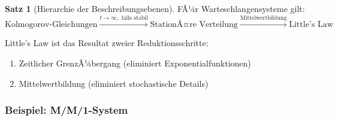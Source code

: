 ﻿\documentclass[a4paper,12pt]{scrreprt}
\theoremstyle{definition}
\newtheorem{satz}{Satz}[section]
\begin{document}
\begin{satz}[Hierarchie der Beschreibungsebenen]
	FÃ¼r Warteschlangensysteme gilt:
	\begin{equation}
		\text{Kolmogorov-Gleichungen} \xrightarrow{t \to \infty, \text{ falls stabil}} \text{StationÃ¤re Verteilung} \xrightarrow{\text{Mittelwertbildung}} \text{Little's Law}
	\end{equation}
	
	Little's Law ist das Resultat zweier Reduktionsschritte:
	\begin{enumerate}
		\item[-] Zeitlicher GrenzÃ¼bergang (eliminiert Exponentialfunktionen)
		\item[-] Mittelwertbildung (eliminiert stochastische Details)
	\end{enumerate}
\end{satz}

\subsubsection{Beispiel: M/M/1-System}
\end{document}
